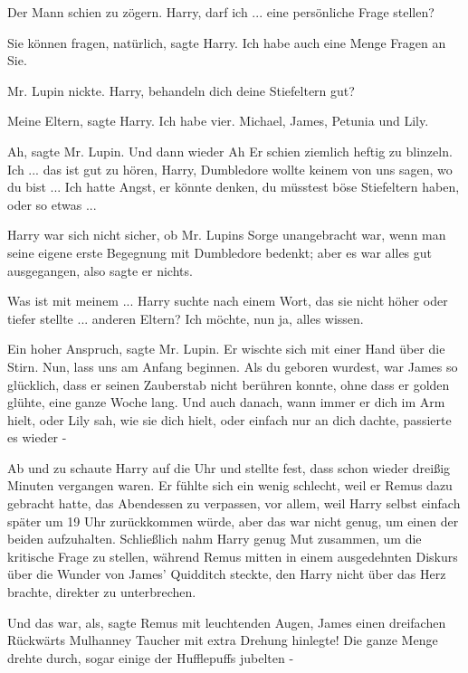 Der Mann schien zu zögern. \glqq{}Harry, darf ich ... eine persönliche Frage
stellen?\grqq{}

\glqq{}Sie können fragen, natürlich\grqq{}, sagte Harry. \glqq{}Ich habe auch eine
Menge Fragen an Sie.\grqq{}

Mr. Lupin nickte. \glqq{}Harry, behandeln dich deine Stiefeltern gut?\grqq{}

\glqq{}Meine Eltern\grqq{}, sagte Harry. \glqq{}Ich habe vier. Michael, James,
Petunia und Lily.\grqq{}

\glqq{}Ah\grqq{}, sagte Mr. Lupin. Und dann wieder \glqq{}Ah\grqq{} Er schien ziemlich
heftig zu blinzeln. \glqq{}Ich ... das ist gut zu hören, Harry, Dumbledore wollte
keinem von uns sagen, wo du bist ... Ich hatte Angst, er könnte denken, du
müsstest böse Stiefeltern haben, oder so etwas ...\grqq{}

Harry war sich nicht sicher, ob Mr. Lupins Sorge unangebracht war, wenn man
seine eigene erste Begegnung mit Dumbledore bedenkt; aber es war alles gut
ausgegangen, also sagte er nichts.

\glqq{}Was ist mit meinem ...\grqq{} Harry suchte nach einem Wort, das sie nicht höher
oder tiefer stellte ... \glqq{}anderen Eltern? Ich möchte, nun ja, alles wissen.\grqq{}

\glqq{}Ein hoher Anspruch\grqq{}, sagte Mr. Lupin. Er wischte sich mit einer Hand
über die Stirn. \glqq{}Nun, lass uns am Anfang beginnen. Als du geboren wurdest,
war James so glücklich, dass er seinen Zauberstab nicht berühren konnte, ohne
dass er golden glühte, eine ganze Woche lang. Und auch danach, wann immer er
dich im Arm hielt, oder Lily sah, wie sie dich hielt, oder einfach nur an dich
dachte, passierte es wieder -\grqq{}

Ab und zu schaute Harry auf die Uhr und stellte fest, dass schon wieder dreißig
Minuten vergangen waren. Er fühlte sich ein wenig schlecht, weil er Remus dazu
gebracht hatte, das Abendessen zu verpassen, vor allem, weil Harry selbst
einfach später um 19 Uhr zurückkommen würde, aber das war nicht genug, um einen
der beiden aufzuhalten. Schließlich nahm Harry genug Mut zusammen, um die
kritische Frage zu stellen, während Remus mitten in einem ausgedehnten Diskurs
über die Wunder von James' Quidditch steckte, den Harry nicht über das Herz
brachte, direkter zu unterbrechen.

\glqq{}Und das war, als\grqq{}, sagte Remus mit leuchtenden Augen, \glqq{}James
einen dreifachen Rückwärts Mulhanney Taucher mit extra Drehung hinlegte! Die
ganze Menge drehte durch, sogar einige der Hufflepuffs jubelten -\grqq{}

